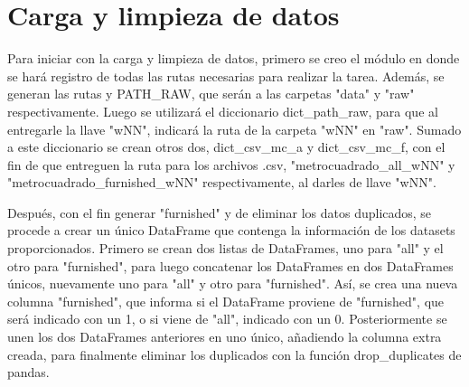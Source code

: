 \section{Carga y limpieza de datos}

Para iniciar con la carga y limpieza de datos, primero se creo el módulo  en donde se hará registro de todas las rutas necesarias para realizar la tarea. Además, se generan las rutas  y PATH\_RAW, que serán a las carpetas "data" y "raw" respectivamente. Luego se utilizará el diccionario dict\_path\_raw, para que al entregarle la llave "wNN", indicará la ruta de la carpeta "wNN" en "raw". Sumado a este diccionario se crean otros dos, dict\_csv\_mc\_a y dict\_csv\_mc\_f, con el fin de que entreguen la ruta para los archivos .csv, "metrocuadrado\_all\_wNN" y "metrocuadrado\_furnished\_wNN" respectivamente, al darles de llave "wNN".

Después, con el fin generar "furnished" y de eliminar los datos duplicados, se procede a crear un único DataFrame que contenga la información de los datasets proporcionados. Primero se crean dos listas de DataFrames, uno para "all" y el otro para "furnished", para luego concatenar los DataFrames en dos DataFrames únicos, nuevamente uno para "all" y otro para "furnished". Así, se crea una nueva columna "furnished", que informa si el DataFrame proviene de "furnished", que será indicado con un 1, o si viene de "all", indicado con un 0. Posteriormente se unen los dos DataFrames anteriores en uno único, añadiendo la columna extra creada, para finalmente eliminar los duplicados con la función drop\_duplicates de pandas.
